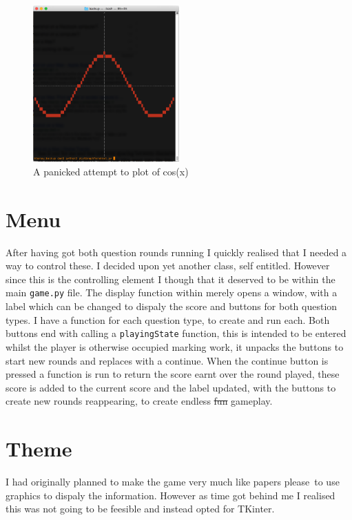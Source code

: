 \documentclass[twocolumn]{article}   %
\begin{document}
\begin{figure}
  \includegraphics[width=0.5\textwidth]{graphScreenshot}
  \caption{A panicked attempt to plot of cos(x)}
\end{figure}

\section{Menu}
After having got both question rounds running I quickly realised that I needed a way to control these. I decided upon yet another class, self entitled. However since this is the controlling element I though that it deserved to be within the main \texttt{game.py} file. The display function within merely opens a window, with a label which can be changed to dispaly the score and buttons for both question types. I have a function for each question type, to create and run each. Both buttons end with calling a \texttt{playingState} function, this is intended to be entered whilst the player is otherwise occupied marking work, it unpacks the buttons to start new rounds and replaces with a continue. When the continue button is pressed a function is run to return the score earnt over the round played, these score is added to the current score and the label updated, with the buttons to create new rounds reappearing, to create endless \st{fun} gameplay.

\section{Theme}
I had originally planned to make the game very much like papers please\, to use graphics to dispaly the information. However as time got behind me I realised this was not going to be feesible and instead opted for TKinter.
\end{document}
